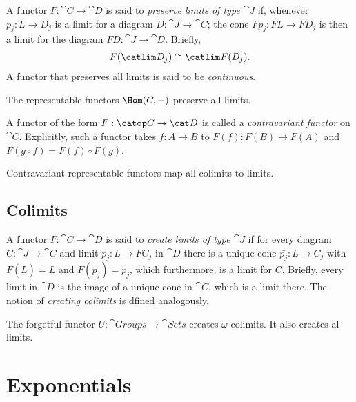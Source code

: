 \documentclass{article}
\begin{document}
\begin{definition}[Awodey p. 106]
	A functor $F:\cat C\to\cat D$ is said to \emph{preserve limits of type $\cat J$} if,
	whenever $p_j:L\to D_j$ is a limit for a diagram $D:\cat J\to\cat C$; the cone
	$Fp_j:FL\to FD_j$ is then a limit for the diagram $FD:\cat J\to\cat D$. Briefly,
	\begin{align*}
		F(\catlim D_j)\cong \catlim F(D_j).
	\end{align*}
	A functor that preserves all limits is said to be \emph{continuous}.
\end{definition}

\begin{proposition}
	The representable functors $\Hom(C,-)$ preserve all limits.
\end{proposition}

\begin{definition}[Awodey p. 107]
	A functor of the form $F:\catop C\to \cat D$ is called a \emph{contravariant
		functor} on $\cat C$. Explicitly, such a functor takes $f:A\to B$ to $F(f):
		F(B)\to F(A)$ and $F(g\circ f)=F(f)\circ F(g)$.
\end{definition}

\begin{corollary}
	Contravariant representable functors map all colimits to limits.
\end{corollary}

\subsection{Colimits}

\begin{definition}[Awodey p. 110]
	A functor $F:\cat C\to\cat D$ is said to \emph{create limits of type $\cat J$}
	if for every diagram $C:\cat J\to\cat C$ and limit $p_j:L\to FC_j$ in $\cat D$
	there is a unique cone $\bar{p_j}:\bar L \to C_j$ with $F(\bar L) = L$ and
	$F(\bar{p_j})=p_j$, which furthermore, is a limit for $C$. Briefly, every limit
	in $\cat D$ is the image of a unique cone in $\cat C$, which is a limit there.
	The notion of \emph{creating colimits} is dfined analogously.
\end{definition}

\begin{proposition}
	The forgetful functor $U:\cat{Groups}\to\cat{Sets}$ creates $\omega$-colimits.
	It also creates al limits.
\end{proposition}

\section{Exponentials}
\end{document}
